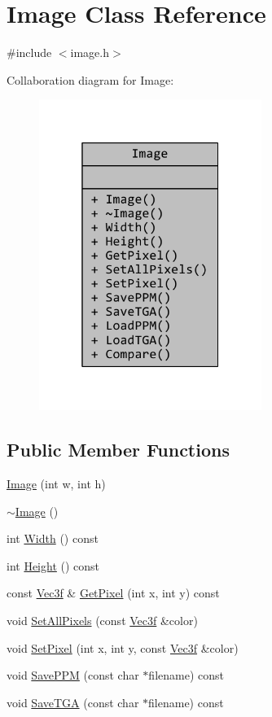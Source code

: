 \hypertarget{classImage}{\section{Image Class Reference}
\label{classImage}
}


{\ttfamily \#include $<$image.\+h$>$}



Collaboration diagram for Image\+:
\nopagebreak
\begin{figure}[H]
\begin{center}
\leavevmode
\includegraphics[width=205pt]{classImage__coll__graph}
\end{center}
\end{figure}
\subsection*{Public Member Functions}
\begin{DoxyCompactItemize}
\item 
\hyperlink{classImage_a05c964ca59502cc32c30e8ab89b5e920}{Image} (int w, int h)
\item 
\hyperlink{classImage_a0294f63700543e11c0f0da85601c7ae5}{$\sim$\+Image} ()
\item 
int \hyperlink{classImage_a55e9332ab0f27716de2b0765e1134aeb}{Width} () const 
\item 
int \hyperlink{classImage_a4ba2103cb0db707dabaea6adbab00be7}{Height} () const 
\item 
const \hyperlink{classVec3f}{Vec3f} \& \hyperlink{classImage_a5902ab3207a0d6f5b8fe92b6f11cb292}{Get\+Pixel} (int x, int y) const 
\item 
void \hyperlink{classImage_a4e91934550b21dd19041ea144e498c3c}{Set\+All\+Pixels} (const \hyperlink{classVec3f}{Vec3f} \&color)
\item 
void \hyperlink{classImage_af2f04f2fe7e6c3aba0401a0c6515963a}{Set\+Pixel} (int x, int y, const \hyperlink{classVec3f}{Vec3f} \&color)
\item 
void \hyperlink{classImage_a7aeb4943c2f410f9a806e91eb917756d}{Save\+P\+P\+M} (const char $\ast$filename) const 
\item 
void \hyperlink{classImage_a12ab68b68cc0f9c6501d2b4a019eb564}{Save\+T\+G\+A} (const char $\ast$filename) const 
\end{DoxyCompactItemize}
